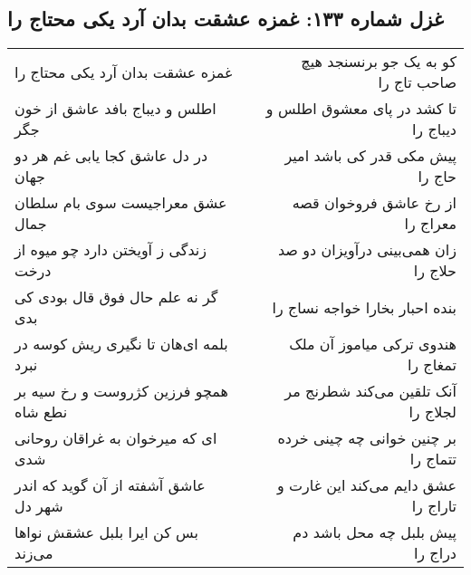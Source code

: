 \begin{center}
\section*{غزل شماره ۱۳۳: غمزه عشقت بدان آرد یکی محتاج را}
\label{sec:0133}
\begin{longtable}{l p{0.5cm} r}
غمزه عشقت بدان آرد یکی محتاج را
&&
کو به یک جو برنسنجد هیچ صاحب تاج را
\\
اطلس و دیباج بافد عاشق از خون جگر
&&
تا کشد در پای معشوق اطلس و دیباج را
\\
در دل عاشق کجا یابی غم هر دو جهان
&&
پیش مکی قدر کی باشد امیر حاج را
\\
عشق معراجیست سوی بام سلطان جمال
&&
از رخ عاشق فروخوان قصه معراج را
\\
زندگی ز آویختن دارد چو میوه از درخت
&&
زان همی‌بینی درآویزان دو صد حلاج را
\\
گر نه علم حال فوق قال بودی کی بدی
&&
بنده احبار بخارا خواجه نساج را
\\
بلمه ای‌هان تا نگیری ریش کوسه در نبرد
&&
هندوی ترکی میاموز آن ملک تمغاج را
\\
همچو فرزین کژروست و رخ سیه بر نطع شاه
&&
آنک تلقین می‌کند شطرنج مر لجلاج را
\\
ای که میرخوان به غراقان روحانی شدی
&&
بر چنین خوانی چه چینی خرده تتماج را
\\
عاشق آشفته از آن گوید که اندر شهر دل
&&
عشق دایم می‌کند این غارت و تاراج را
\\
بس کن ایرا بلبل عشقش نواها می‌زند
&&
پیش بلبل چه محل باشد دم دراج را
\\
\end{longtable}
\end{center}
